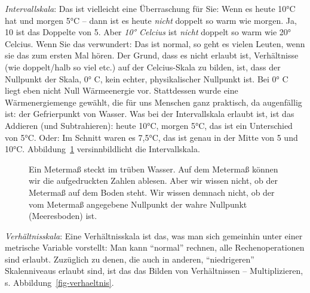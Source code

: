 \documentclass[
  letterpaper,
]{scrbook}
\theoremstyle{definition}
\theoremstyle{definition}
\theoremstyle{definition}
\theoremstyle{remark}
\begin{document}
\emph{Intervallskala}: Das ist vielleicht eine Überraschung für Sie:
Wenn es heute 10°C hat und morgen 5°C -- dann ist es heute \emph{nicht}
doppelt so warm wie morgen. Ja, 10 ist das Doppelte von 5. Aber
\emph{10° Celcius} ist \emph{nicht} doppelt so warm wie 20° Celcius.
Wenn Sie das verwundert: Das ist normal, so geht es vielen Leuten, wenn
sie das zum ersten Mal hören. Der Grund, dass es nicht erlaubt ist,
Verhältnisse (wie doppelt/halb so viel etc.) auf der Celcius-Skala zu
bilden, ist, dass der Nullpunkt der Skala, 0° C, kein echter,
physikalischer Nullpunkt ist. Bei 0° C liegt eben nicht Null
Wärmeenergie vor. Stattdessen wurde eine Wärmenergiemenge gewählt, die
für uns Menschen ganz praktisch, da augenfällig ist: der Gefrierpunkt
von Wasser. Was bei der Intervallskala erlaubt ist, ist das Addieren
(und Subtrahieren): heute 10°C, morgen 5°C, das ist ein Unterschied von
5°C. Oder: Im Schnitt waren es 7,5°C, das ist genau in der Mitte von 5
und 10°C. Abbildung~\ref{fig-intervall} versinnbildlicht die
Intervallskala.

\begin{figure}


\caption{\label{fig-intervall}Ein Metermaß steckt im trüben Wasser. Auf
dem Metermaß können wir die aufgedruckten Zahlen ablesen. Aber wir
wissen nicht, ob der Metermaß auf dem Boden steht. Wir wissen demnach
nicht, ob der vom Metermaß angegebene Nullpunkt der wahre Nullpunkt
(Meeresboden) ist.}

\end{figure}%

\emph{Verhältnisskala}: Eine Verhältnisskala ist das, was man sich
gemeinhin unter einer metrische Variable vorstellt: Man kann
\enquote{normal} rechnen, alle Rechenoperationen sind erlaubt. Zuzüglich
zu denen, die auch in anderen, \enquote{niedrigeren} Skalenniveaus
erlaubt sind, ist das das Bilden von Verhältnissen -- Multiplizieren, s.
Abbildung~\ref{fig-verhaeltnis}.
\end{document}
